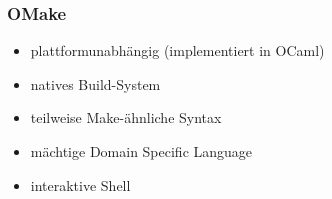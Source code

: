 \begin{frame}
	\frametitle{OMake}
	\begin{itemize}
		\item plattformunabhängig (implementiert in OCaml)
		\item natives Build-System
		\item teilweise Make-ähnliche Syntax
		\item mächtige Domain Specific Language
		\item interaktive Shell
	\end{itemize}
\end{frame}
